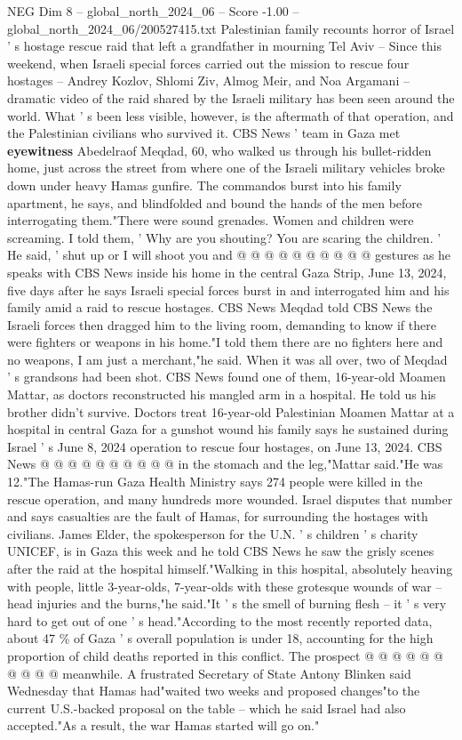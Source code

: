 \begin{textsample}{NEG Dim 8 – global\_north\_2024\_06 – Score -1.00 – global\_north\_2024\_06/200527415.txt}  \label{ex:f8_neg_396}
Palestinian family recounts horror of Israel ' s hostage rescue raid that left a grandfather in mourning Tel Aviv -- Since this weekend, when Israeli special forces carried out the mission to rescue four hostages -- Andrey Kozlov, Shlomi Ziv, Almog Meir, and Noa Argamani -- dramatic video of the raid shared by the Israeli military has been seen around the world.
What ' s been less visible, however, is the aftermath of that operation, and the Palestinian civilians who survived it.
CBS News ' team in Gaza met \textbf{eyewitness} Abedelraof Meqdad, 60, who walked us through his bullet-ridden home, just across the street from where one of the Israeli military vehicles broke down under heavy Hamas gunfire.
The commandos burst into his family apartment, he says, and blindfolded and bound the hands of the men before interrogating them."There were sound grenades.
Women and children were screaming.
I told them, ' Why are you shouting?
You are scaring the children. ' He said, ' shut up or I will shoot you and @ @ @ @ @ @ @ @ @ @ gestures as he speaks with CBS News inside his home in the central Gaza Strip, June 13, 2024, five days after he says Israeli special forces burst in and interrogated him and his family amid a raid to rescue hostages.
CBS News Meqdad told CBS News the Israeli forces then dragged him to the living room, demanding to know if there were fighters or weapons in his home."I told them there are no fighters here and no weapons, I am just a merchant,"he said.
When it was all over, two of Meqdad ' s grandsons had been shot.
CBS News found one of them, 16-year-old Moamen Mattar, as doctors reconstructed his mangled arm in a hospital.
He told us his brother didn't survive.
Doctors treat 16-year-old Palestinian Moamen Mattar at a hospital in central Gaza for a gunshot wound his family says he sustained during Israel ' s June 8, 2024 operation to rescue four hostages, on June 13, 2024.
CBS News @ @ @ @ @ @ @ @ @ @ in the stomach and the leg,"Mattar said."He was 12."The Hamas-run Gaza Health Ministry says 274 people were killed in the rescue operation, and many hundreds more wounded.
Israel disputes that number and says casualties are the fault of Hamas, for surrounding the hostages with civilians.
James Elder, the spokesperson for the U.N. ' s children ' s charity UNICEF, is in Gaza this week and he told CBS News he saw the grisly scenes after the raid at the hospital himself."Walking in this hospital, absolutely heaving with people, little 3-year-olds, 7-year-olds with these grotesque wounds of war -- head injuries and the burns,"he said."It ' s the smell of burning flesh -- it ' s very hard to get out of one ' s head."According to the most recently reported data, about 47 \% of Gaza ' s overall population is under 18, accounting for the high proportion of child deaths reported in this conflict.
The prospect @ @ @ @ @ @ @ @ @ @ meanwhile.
A frustrated Secretary of State Antony Blinken said Wednesday that Hamas had"waited two weeks and proposed changes"to the current U.S.-backed proposal on the table -- which he said Israel had also accepted."As a result, the war Hamas started will go on."

\end{textsample}
